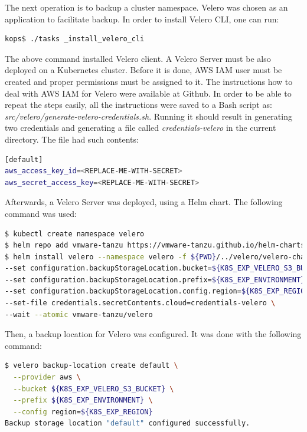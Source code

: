 The next operation is to backup a cluster namespace. Velero was chosen as an application to facilitate backup. In order to install Velero CLI, one can run:
\begin{lstlisting}[basicstyle=\tiny,caption={TODO},captionpos=b,language=Bash,xleftmargin=1cm]
kops$ ./tasks _install_velero_cli
\end{lstlisting}

The above command installed Velero client. A Velero Server must be also deployed on a Kubernetes cluster. Before it is done, AWS IAM user must be created and proper permissions must be assigned to it. The instructions how to deal with AWS IAM for Velero were available at Github\cite{velero-aws-plugin}. In order to be able to repeat the steps easily, all the instructions were saved to a Bash script as: \textit{src/velero/generate-velero-credentials.sh}. Running it should result in generating two credentials and generating a file called \textit{credentials-velero} in the current directory. The file had such contents:
\begin{lstlisting}[basicstyle=\tiny,caption={TODO},captionpos=b,language=Bash,xleftmargin=1cm]
[default]
aws_access_key_id=<REPLACE-ME-WITH-SECRET>
aws_secret_access_key=<REPLACE-ME-WITH-SECRET>
\end{lstlisting}

Afterwards, a Velero Server was deployed, using a Helm chart. The following command was used:

\begin{lstlisting}[basicstyle=\tiny,caption={TODO},captionpos=b,language=Bash,xleftmargin=1cm]
$ kubectl create namespace velero
$ helm repo add vmware-tanzu https://vmware-tanzu.github.io/helm-charts
$ helm install velero --namespace velero -f ${PWD}/../velero/velero-chart-values.yaml \
--set configuration.backupStorageLocation.bucket=${K8S_EXP_VELERO_S3_BUCKET} \
--set configuration.backupStorageLocation.prefix=${K8S_EXP_ENVIRONMENT} \
--set configuration.backupStorageLocation.config.region=${K8S_EXP_REGION} \
--set-file credentials.secretContents.cloud=credentials-velero \
--wait --atomic vmware-tanzu/velero
\end{lstlisting}

Then, a backup location for Velero was configured. It was done with the following command:
\begin{lstlisting}[basicstyle=\tiny,caption={TODO},captionpos=b,language=Bash,xleftmargin=1cm]
$ velero backup-location create default \
  --provider aws \
  --bucket ${K8S_EXP_VELERO_S3_BUCKET} \
  --prefix ${K8S_EXP_ENVIRONMENT} \
  --config region=${K8S_EXP_REGION}
Backup storage location "default" configured successfully.
\end{lstlisting}

